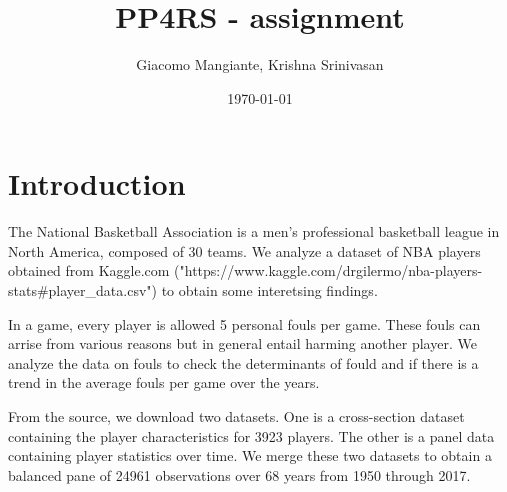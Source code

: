 \documentclass[12pt]{article}
\begin{document}
\title{PP4RS  - assignment}
\author{Giacomo Mangiante, Krishna Srinivasan}
\date{\today}
\maketitle

\section{Introduction}

The National Basketball Association is a men's professional basketball
league in North America, composed of 30 teams. We analyze a dataset
of NBA players obtained from Kaggle.com
 ("https://www.kaggle.com/drgilermo/nba-players-stats#player_data.csv") to
 obtain some interetsing findings.

In a game, every player is allowed 5 personal fouls per game.
These fouls can arrise from various reasons but in general entail
harming another player. We analyze the data on fouls to check the determinants
of fould and if there is a trend in the average fouls per game over the years.

From the source, we download two datasets. One is a cross-section dataset containing
the player characteristics for 3923 players. The other is a panel data
containing player statistics over time. We merge these two datasets to
obtain a balanced pane of 24961 observations over 68 years from 1950 through
2017.


 
\end{document}
